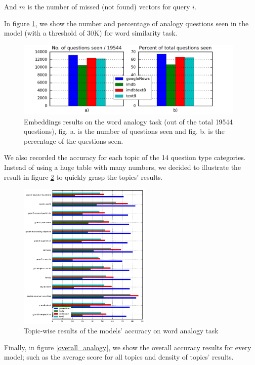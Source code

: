 \documentclass[11pt,letterpaper]{article}
\begin{document}
And \(m\) is the number of missed (not found) vectors for query \(i\).

In figure \ref{fig:question_seen}, we show the number and percentage of
analogy questions seen in the model (with a threshold of 30K) for word
similarity task.



\begin{figure}
\centering
\includegraphics{img/em-questions.png}
\caption{Embeddings results on the word analogy task (out of the total
19544 questions), fig. a. is the number of questions seen and fig. b. is
the percentage of the questions seen.\label{fig:question_seen}}
\end{figure}



We also recorded the accuracy for each topic of the 14 question type
categories. Instead of using a huge table with many numbers, we decided
to illustrate the result in figure \ref{fig:topics_acc} to quickly grasp
the topics' results.

\begin{figure}
\centering
\includegraphics[width=65mm]{img/em-topics-acc.png}
\caption{Topic-wise results of the models' accuracy on word analogy
task}
\label{fig:topics_acc}
\end{figure}

Finally, in figure \ref{overall_analogy}, we show the overall accuracy
results for every model; such as the average score for all topics and
density of topics' results.
\end{document}
